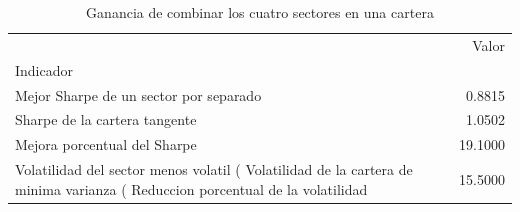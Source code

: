 \begin{table}
\caption{Ganancia de combinar los cuatro sectores en una cartera}
\label{tab:tabla10_ganancia_diversificacion}
\begin{tabular}{lr}
\toprule
 & Valor \\
Indicador &  \\
\midrule
Mejor Sharpe de un sector por separado & 0.8815 \\
Sharpe de la cartera tangente & 1.0502 \\
Mejora porcentual del Sharpe & 19.1000 \\
Volatilidad del sector menos volatil (%
Volatilidad de la cartera de minima varianza (%
Reduccion porcentual de la volatilidad & 15.5000 \\
\bottomrule
\end{tabular}
\end{table}
